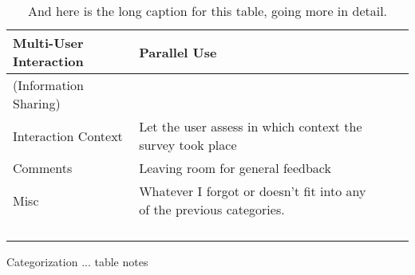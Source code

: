 \begin{table}[h]
\begin{tabular}{|p{4cm}|p{6cm}|p{3cm}|p{2cm}|}
Multi-User Interaction                & Parallel Use                                                          &                                              &                         \\ \hline
(Information Sharing)                 &                                                                       &                                              &                         \\ \hline
Interaction Context                   & Let the user assess in which context the survey took place            &                                              &                         \\ \hline
Comments                              & Leaving room for general feedback                                     &                                              &                         \\ \hline
Misc                                  & Whatever I forgot or doesn't fit into any of the previous categories. &                                              &                         \\
                                      &                                                                       &                                              &                         \\
                                      &                                                                       &                                              &                         \\
                                      &                                                                       &                                              &                         \\
                                      &                                                                       &                                              &                        
\end{tabular}
		\begin{tablenotes}
		      \small
		      \item Categorization ... table notes 
		\end{tablenotes}
		\caption[Short Caption]{And here is the long caption for this table, going more in detail.}
\end{table}		    

